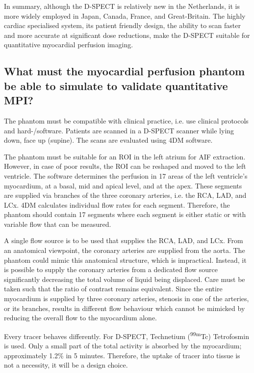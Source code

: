In summary, although the D-SPECT is relatively new in the Netherlands, it is more widely employed in Japan, Canada, France, and Great-Britain. The highly cardiac specialised system, its patient friendly design, the ability to scan faster and more accurate at significant dose reductions, make the D-SPECT suitable for quantitative myocardial perfusion imaging. 

\subsection{What must the myocardial perfusion phantom be able to simulate to validate quantitative MPI?}
\label{sec:what_perf}
The phantom must be compatible with clinical practice, i.e. use clinical protocols and hard-/software. Patients are scanned in a D-SPECT scanner while lying down, face up (supine). The scans are evaluated using 4DM software. 

The phantom must be suitable for an ROI in the left atrium for \ac{AIF} extraction. However, in case of poor results, the ROI can be reshaped and moved to the left ventricle. The software determines the perfusion in 17 areas of the left ventricle's myocardium, at a basal, mid and apical level, and at the apex. These segments are supplied via branches of the three coronary arteries, i.e. the RCA, LAD, and LCx. 4DM calculates individual flow rates for each segment. Therefore, the phantom should contain 17 segments where each segment is either static or with variable flow that can be measured. 

A single flow source is to be used that supplies the RCA, LAD, and LCx. From an anatomical viewpoint, the coronary arteries are supplied from the aorta. The phantom could mimic this anatomical structure, which is impractical. Instead, it is possible to supply the coronary arteries from a dedicated flow source significantly decreasing the total volume of liquid being displaced. Care must be taken such that the ratio of contrast remains equivalent. Since the entire myocardium is supplied by three coronary arteries, stenosis in one of the arteries, or its branches, results in different flow behaviour which cannot be mimicked by reducing the overall flow to the myocardium alone.

Every tracer behaves differently. For D-SPECT, Technetium (\textsuperscript{99m}Tc) Tetrofosmin is used. Only a small part of the total activity is absorbed by the myocardium; approximately 1.2\% in 5 minutes. Therefore, the uptake of tracer into tissue is not a necessity, it will be a design choice. 


